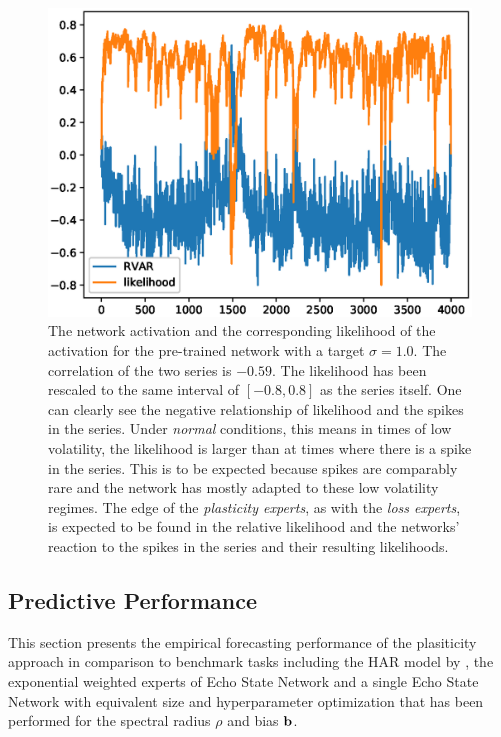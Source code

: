 \begin{figure} 
    \begin{center}
        \includegraphics[width=\textwidth]{Plots/likelihood_evolution_1.eps}
    \end{center}
    \caption{The network activation and the corresponding likelihood of the activation for the pre-trained network with a target $\sigma = 1.0$. The correlation of the two series is $-0.59$. The likelihood has been rescaled to the same interval of $[-0.8, 0.8]$ as the series itself. One can clearly see the negative relationship of likelihood and the spikes in the series. Under \textit{normal} conditions, this means in times of low volatility, the likelihood is larger than at times where there is a spike in the series. This is to be expected because spikes are comparably rare and the network has mostly adapted to these low volatility regimes. The edge of the \textit{plasticity experts}, as with the \textit{loss experts}, is expected to be found in the relative likelihood and the networks' reaction to the spikes in the series and their resulting likelihoods.}
    \label{FIG:IBMRVAR}
\end{figure}


\subsection{Predictive Performance}

This section presents the empirical forecasting performance of the plasiticity approach in comparison to benchmark tasks including the HAR model by \cite{Corsi2009}, the exponential weighted experts of Echo State Network and a single Echo State Network with equivalent size and hyperparameter optimization that has been performed for the spectral radius $\rho$ and bias ${\bf b}$.

